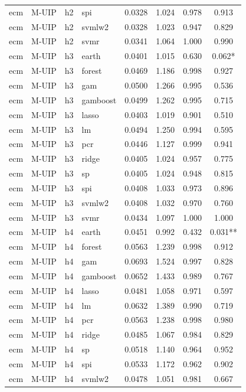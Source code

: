 \begin{ThreePartTable}
\begin{longtable}[t]{llclcccc}
ecm & M-UIP & h2 & spi & 0.0328 & 1.024 & 0.978 & 0.913\\
ecm & M-UIP & h2 & svmlw2 & 0.0328 & 1.023 & 0.947 & 0.829\\
ecm & M-UIP & h2 & svmr & 0.0341 & 1.064 & 1.000 & 0.990\\
\addlinespace
ecm & M-UIP & h3 & earth & 0.0401 & 1.015 & 0.630 & 0.062*\\
ecm & M-UIP & h3 & forest & 0.0469 & 1.186 & 0.998 & 0.927\\
ecm & M-UIP & h3 & gam & 0.0500 & 1.266 & 0.995 & 0.536\\
ecm & M-UIP & h3 & gamboost & 0.0499 & 1.262 & 0.995 & 0.715\\
ecm & M-UIP & h3 & lasso & 0.0403 & 1.019 & 0.901 & 0.510\\
ecm & M-UIP & h3 & lm & 0.0494 & 1.250 & 0.994 & 0.595\\
ecm & M-UIP & h3 & pcr & 0.0446 & 1.127 & 0.999 & 0.941\\
ecm & M-UIP & h3 & ridge & 0.0405 & 1.024 & 0.957 & 0.775\\
ecm & M-UIP & h3 & sp & 0.0405 & 1.024 & 0.948 & 0.815\\
ecm & M-UIP & h3 & spi & 0.0408 & 1.033 & 0.973 & 0.896\\
ecm & M-UIP & h3 & svmlw2 & 0.0408 & 1.032 & 0.970 & 0.760\\
ecm & M-UIP & h3 & svmr & 0.0434 & 1.097 & 1.000 & 1.000\\
\addlinespace
ecm & M-UIP & h4 & earth & 0.0451 & 0.992 & 0.432 & 0.031**\\
ecm & M-UIP & h4 & forest & 0.0563 & 1.239 & 0.998 & 0.912\\
ecm & M-UIP & h4 & gam & 0.0693 & 1.524 & 0.997 & 0.828\\
ecm & M-UIP & h4 & gamboost & 0.0652 & 1.433 & 0.989 & 0.767\\
ecm & M-UIP & h4 & lasso & 0.0481 & 1.058 & 0.971 & 0.597\\
ecm & M-UIP & h4 & lm & 0.0632 & 1.389 & 0.990 & 0.719\\
ecm & M-UIP & h4 & pcr & 0.0563 & 1.238 & 0.998 & 0.980\\
ecm & M-UIP & h4 & ridge & 0.0485 & 1.067 & 0.984 & 0.829\\
ecm & M-UIP & h4 & sp & 0.0518 & 1.140 & 0.964 & 0.952\\
ecm & M-UIP & h4 & spi & 0.0533 & 1.172 & 0.962 & 0.902\\
ecm & M-UIP & h4 & svmlw2 & 0.0478 & 1.051 & 0.981 & 0.667\\

\end{longtable}
\end{ThreePartTable}
